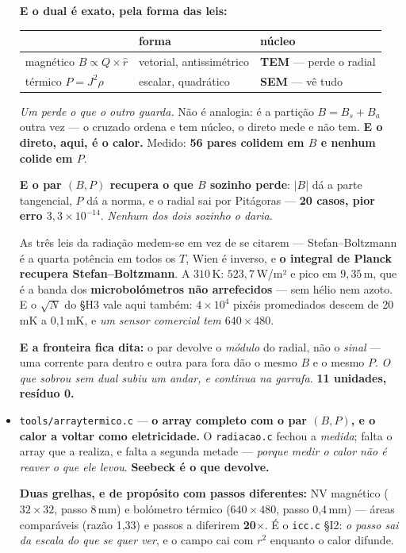 \documentclass[11pt]{article}
\newcommand{\code}[1]{\texttt{\small #1}}
\theoremstyle{plain}
\theoremstyle{remark}
\begin{document}
\begin{itemize}
\textbf{E o dual é exato, pela forma das leis:}

\begin{center}
\begin{tabular}{lll}
\toprule
 & forma & núcleo \\
\midrule
magnético $B \propto Q\times\hat r$ & vetorial, antissimétrico & \textbf{TEM} --- perde o radial \\
térmico $P = J^2\rho$ & escalar, quadrático & \textbf{SEM} --- vê tudo \\
\bottomrule
\end{tabular}
\end{center}

\emph{Um perde o que o outro guarda.} Não é analogia: é a partição $B = B_s + B_a$ outra vez --- o
cruzado ordena e tem núcleo, o direto mede e não tem. \textbf{E o direto, aqui, é o calor.} Medido:
\textbf{56 pares colidem em $B$ e nenhum colide em $P$}.

\textbf{E o par $(B,P)$ recupera o que $B$ sozinho perde}: $|B|$ dá a parte tangencial, $P$ dá a
norma, e o radial sai por Pitágoras --- \textbf{20 casos, pior erro $3{,}3\times10^{-14}$}.
\emph{Nenhum dos dois sozinho o daria.}

As três leis da radiação medem-se em vez de se citarem --- Stefan--Boltzmann é a quarta potência em
todos os $T$, Wien é inverso, e \textbf{o integral de Planck recupera Stefan--Boltzmann}. A
$310$\,K: $523{,}7$\,W/m² e pico em $9{,}35$\,\textmu m, que é a banda dos \textbf{microbolómetros
não arrefecidos} --- sem hélio nem azoto. E o $\sqrt{N}$ do §H3 vale aqui também: $4\times10^4$
pixéis promediados descem de 20\,mK a 0,1\,mK, e \emph{um sensor comercial tem $640\times480$}.

\textbf{E a fronteira fica dita:} o par devolve o \emph{módulo} do radial, não o \emph{sinal} ---
uma corrente para dentro e outra para fora dão o mesmo $B$ e o mesmo $P$. \emph{O que sobrou sem
dual subiu um andar, e continua na garrafa.} \textbf{11 unidades, resíduo 0.}


\item \code{tools/arraytermico.c} --- \textbf{o array completo com o par $(B,P)$, e o calor a voltar
como eletricidade.} O \code{radiacao.c} fechou a \emph{medida}; falta o array que a realiza, e falta
a segunda metade --- \emph{porque medir o calor não é reaver o que ele levou}. \textbf{Seebeck é o
que devolve.}

\textbf{Duas grelhas, e de propósito com passos diferentes:} NV magnético ($32\times32$, passo
8\,mm) e bolómetro térmico ($640\times480$, passo 0,4\,mm) --- áreas comparáveis (razão 1,33) e
passos a diferirem \textbf{20$\times$}. É o \code{icc.c} §I2: \emph{o passo sai da escala do que se
quer ver}, e o campo cai com $r^2$ enquanto o calor difunde.


\end{itemize}
\end{document}
